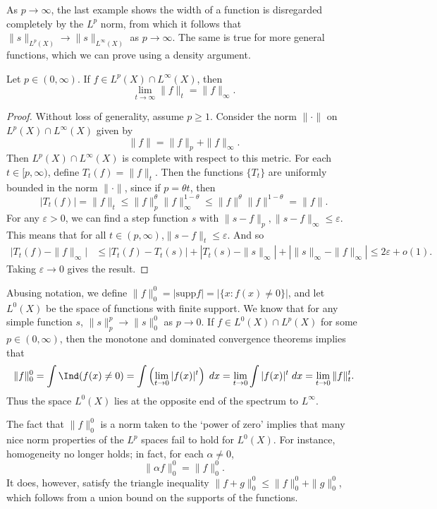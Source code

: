 As $p \to \infty$, the last example shows the width of a function is disregarded completely by the $L^p$ norm, from which it follows that $\| s \|_{L^p(X)} \to \| s \|_{L^\infty(X)}$ as $p \to \infty$. The same is true for more general functions, which we can prove using a density argument.

\begin{theorem}
    Let $p \in (0,\infty)$. If $f \in L^p(X) \cap L^\infty(X)$, then
    \[ \lim_{t \to \infty} \| f \|_t = \| f \|_\infty. \]
\end{theorem}
\begin{proof}
    Without loss of generality, assume $p \geq 1$. Consider the norm $\| \cdot \|$ on $L^p(X) \cap L^\infty(X)$ given by
    \[ \| f \| = \| f \|_p + \| f \|_\infty. \]
    Then $L^p(X) \cap L^\infty(X)$ is complete with respect to this metric. For each $t \in [p,\infty)$, define $T_t(f) = \| f \|_t$. Then the functions $\{ T_t \}$ are uniformly bounded in the norm $\| \cdot \|$, since if $p = \theta t$, then
    \[ |T_t(f)| = \| f \|_t \leq \| f \|_p^\theta \| f \|_\infty^{1-\theta} \leq \| f \|^\theta \| f \|^{1-\theta} = \| f \|. \]
    For any $\varepsilon > 0$, we can find a step function $s$ with $\| s - f \|_p, \| s - f \|_\infty \leq \varepsilon$. This means that for all $t \in (p,\infty)$,$\| s - f \|_t \leq \varepsilon$. And so
    \begin{align*}
        \Big| T_t(f) - \| f \|_\infty \Big| &\leq |T_t(f) - T_t(s)| + |T_t(s) - \| s \|_\infty| + |\| s \|_\infty - \| f \|_\infty| \leq 2\varepsilon + o(1).
    \end{align*}
    Taking $\varepsilon \to 0$ gives the result.
\end{proof}

Abusing notation, we define $\| f \|_0^0 = | \text{supp} f | = | \{ x: f(x) \neq 0 \} |$, and let $L^0(X)$ be the space of functions with finite support. We know that for any simple function $s$, $\| s \|_p^p \to \| s \|_0^0$ as $p \to 0$. If $f \in L^0(X) \cap L^p(X)$ for some $p \in (0,\infty)$, then the monotone and dominated convergence theorems implies that
%
\[ \| f \|_0^0 = \int \Ind(f(x) \neq 0) = \int \left( \lim_{t \to 0} |f(x)|^t \right)\; dx = \lim_{t \to 0} \int |f(x)|^t\; dx = \lim_{t \to 0} \| f \|_t^t. \]
%
Thus the space $L^0(X)$ lies at the opposite end of the spectrum to $L^\infty$.

The fact that $\| f \|_0^0$ is a norm taken to the `power of zero' implies that many nice norm properties of the $L^p$ spaces fail to hold for $L^0(X)$. For instance, homogeneity no longer holds; in fact, for each $\alpha \neq 0$,
%
\[ \| \alpha f \|_0^0 = \| f \|_0^0. \]
%
It does, however, satisfy the triangle inequality $\| f + g \|_0^0 \leq \| f \|_0^0 + \| g \|_0^0$, which follows from a union bound on the supports of the functions.


